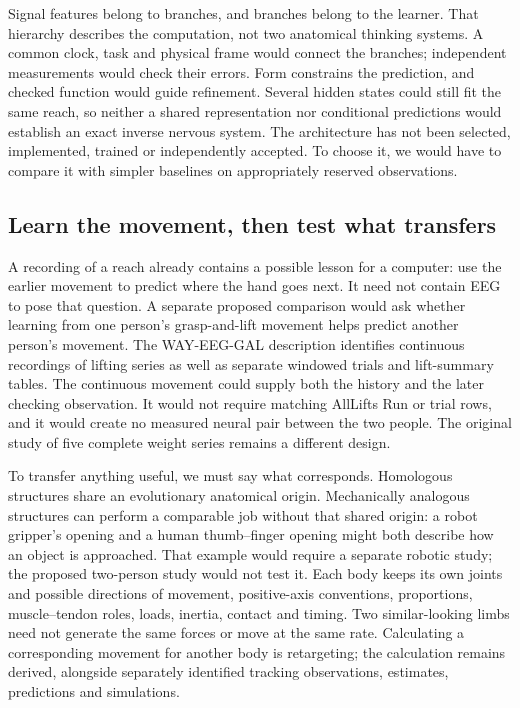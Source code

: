 Signal features belong to branches, and branches belong to the learner.
That hierarchy describes the computation, not two anatomical thinking systems.
A common clock, task and physical frame would connect the branches; independent
measurements would check their errors. Form constrains the prediction, and
checked function would guide refinement. Several hidden states could still
fit the same reach, so neither a shared representation nor conditional
predictions would establish an exact inverse nervous system. The architecture
has not been selected, implemented, trained or independently accepted.
To choose it, we would have to compare it with simpler baselines on
appropriately reserved observations.

\subsection{Learn the movement, then test what transfers}

A recording of a reach already contains a possible lesson for a computer: use the earlier movement to predict where the hand goes next. It need not contain EEG to pose that question. A separate proposed comparison would ask whether learning from one person's grasp-and-lift movement helps predict another person's movement. The WAY-EEG-GAL description identifies continuous recordings of lifting series as well as separate windowed trials and lift-summary tables.\citep{luciw2014way} The continuous movement could supply both the history and the later checking observation. It would not require matching AllLifts Run or trial rows, and it would create no measured neural pair between the two people. The original study of five complete weight series remains a different design.

To transfer anything useful, we must say what corresponds. Homologous structures share an evolutionary anatomical origin. Mechanically analogous structures can perform a comparable job without that shared origin: a robot gripper's opening and a human thumb--finger opening might both describe how an object is approached. That example would require a separate robotic study; the proposed two-person study would not test it. Each body keeps its own joints and possible directions of movement, positive-axis conventions, proportions, muscle--tendon roles, loads, inertia, contact and timing. Two similar-looking limbs need not generate the same forces or move at the same rate. Calculating a corresponding movement for another body is retargeting; the calculation remains derived, alongside separately identified tracking observations, estimates, predictions and simulations.

